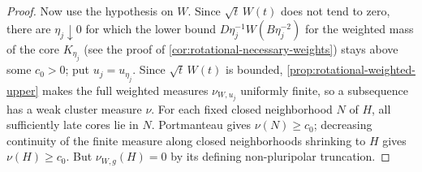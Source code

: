\begin{proof}
Now use the hypothesis on $W$. Since $\sqrt t\,W(t)$ does not tend to zero,
there are $\eta_j\downarrow0$ for which the lower bound
$D\eta_j^{-1}W(B\eta_j^{-2})$ for the weighted mass of the core $K_{\eta_j}$
(see the proof of \cref{cor:rotational-necessary-weights}) stays above some
$c_0>0$; put $u_j=u_{\eta_j}$. Since $\sqrt t\,W(t)$ is bounded,
\cref{prop:rotational-weighted-upper} makes the full weighted measures
$\nu_{W,u_j}$ uniformly finite, so a subsequence has a weak cluster measure $\nu$.
For each fixed closed neighborhood $N$ of $H$, all sufficiently late
cores lie in $N$. Portmanteau gives $\nu(N)\geq c_0$; decreasing
continuity of the finite measure along closed neighborhoods shrinking to $H$ gives $\nu(H)\geq c_0$.
But $\nu_{W,g}(H)=0$ by its defining non-pluripolar truncation.
\end{proof}

